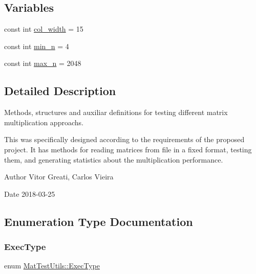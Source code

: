 \subsection*{Variables}
\begin{DoxyCompactItemize}
\item 
const int \mbox{\hyperlink{namespaceMatTestUtils_a8d91bda429e88080233eaa273c885863}{col\+\_\+width}} = 15
\item 
const int \mbox{\hyperlink{namespaceMatTestUtils_ac809b72319e3d38f960650baf31dc1e6}{min\+\_\+n}} = 4
\item 
const int \mbox{\hyperlink{namespaceMatTestUtils_aae57ce6440d799106e6f95f6094b2d6d}{max\+\_\+n}} = 2048
\end{DoxyCompactItemize}


\subsection{Detailed Description}
Methods, structures and auxiliar definitions for testing different matrix multiplication approachs. 

This was specifically designed according to the requirements of the proposed project. It has methods for reading matrices from file in a fixed format, testing them, and generating statistics about the multiplication performance.

\begin{DoxyAuthor}{Author}
Vitor Greati, Carlos Vieira 
\end{DoxyAuthor}
\begin{DoxyDate}{Date}
2018-\/03-\/25 
\end{DoxyDate}


\subsection{Enumeration Type Documentation}
\mbox{\label{namespaceMatTestUtils_a8ce892071d861e65dd62ef377efaaa6b}} 
\subsubsection{\texorpdfstring{Exec\+Type}{ExecType}}
{\footnotesize\ttfamily enum \mbox{\hyperlink{namespaceMatTestUtils_a8ce892071d861e65dd62ef377efaaa6b}{Mat\+Test\+Utils\+::\+Exec\+Type}}}



